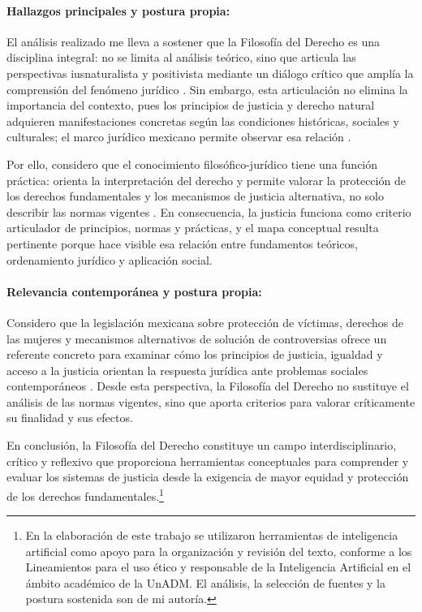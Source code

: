 \documentclass[
	spanish, %
	letterpaper, oneside
]{article}
\begin{document}
\paragraph{Hallazgos principales y postura propia:}

El análisis realizado me lleva a sostener que la Filosofía del Derecho es una disciplina integral: no se limita al análisis teórico, sino que articula las perspectivas iusnaturalista y positivista mediante un diálogo crítico que amplía la comprensión del fenómeno jurídico \cite{finnisEstudiosTeoriaDerecho2017,ruizrodriguezFilosofiaDerecho2009,lovonManualPracticoFilosofia2020}. Sin embargo, esta articulación no elimina la importancia del contexto, pues los principios de justicia y derecho natural adquieren manifestaciones concretas según las condiciones históricas, sociales y culturales; el marco jurídico mexicano permite observar esa relación \cite{cpeum2026,LeyAmparoReglamentaria,LeyGeneralVictimas}.

Por ello, considero que el conocimiento filosófico-jurídico tiene una función práctica: orienta la interpretación del derecho y permite valorar la protección de los derechos fundamentales y los mecanismos de justicia alternativa, no solo describir las normas vigentes \cite{lastraConceptosJuridicosFundamentales}. En consecuencia, la justicia funciona como criterio articulador de principios, normas y prácticas, y el mapa conceptual resulta pertinente porque hace visible esa relación entre fundamentos teóricos, ordenamiento jurídico y aplicación social.

\paragraph{Relevancia contemporánea y postura propia:}

Considero que la legislación mexicana sobre protección de víctimas, derechos de las mujeres y mecanismos alternativos de solución de controversias ofrece un referente concreto para examinar cómo los principios de justicia, igualdad y acceso a la justicia orientan la respuesta jurídica ante problemas sociales contemporáneos \cite{LeyGeneralVictimas,franzoniacevedoLeyGeneralAcceso2017,lastraConceptosJuridicosFundamentales}. Desde esta perspectiva, la Filosofía del Derecho no sustituye el análisis de las normas vigentes, sino que aporta criterios para valorar críticamente su finalidad y sus efectos.

En conclusión, la Filosofía del Derecho constituye un campo interdisciplinario, crítico y reflexivo que proporciona herramientas conceptuales para comprender y evaluar los sistemas de justicia desde la exigencia de mayor equidad y protección de los derechos fundamentales.\footnote{En la elaboración de este trabajo se utilizaron herramientas de inteligencia artificial como apoyo para la organización y revisión del texto, conforme a los Lineamientos para el uso ético y responsable de la Inteligencia Artificial en el ámbito académico de la UnADM. El análisis, la selección de fuentes y la postura sostenida son de mi autoría.}

\clearpage



\end{document}
